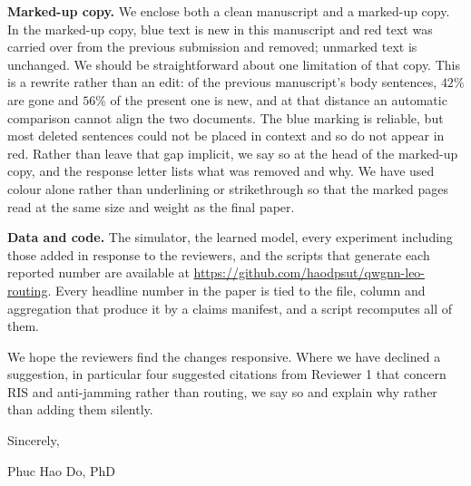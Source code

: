 \documentclass[11pt]{article}
\begin{document}
\textbf{Marked-up copy.} We enclose both a clean manuscript and a marked-up copy. In the
marked-up copy, \textcolor[rgb]{0,0,0.75}{blue} text is new in this manuscript and
\textcolor[rgb]{0.7,0,0}{red} text was carried over from the previous submission and removed;
unmarked text is unchanged. We should be straightforward about one limitation of that copy. This
is a rewrite rather than an edit: of the previous manuscript's body sentences, $42\%$ are gone and
$56\%$ of the present one is new, and at that distance an automatic comparison cannot align the
two documents. The blue marking is reliable, but most deleted sentences could not be placed in
context and so do not appear in red. Rather than leave that gap implicit, we say so at the head of
the marked-up copy, and the response letter lists what was removed and why. We have used colour
alone rather than underlining or strikethrough so that the marked pages read at the same size and
weight as the final paper.

\textbf{Data and code.} The simulator, the learned model, every experiment including those added in
response to the reviewers, and the scripts that generate each reported number are available at
\url{https://github.com/haodpsut/qwgnn-leo-routing}. Every headline number in the paper is tied to
the file, column and aggregation that produce it by a claims manifest, and a script recomputes all
of them.

We hope the reviewers find the changes responsive. Where we have declined a suggestion, in
particular four suggested citations from Reviewer 1 that concern RIS and anti-jamming rather than
routing, we say so and explain why rather than adding them silently.

\bigskip
Sincerely,

\bigskip
Phuc Hao Do, PhD
\end{document}
